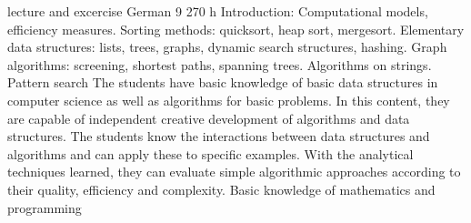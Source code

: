 {lecture and excercise}
{German}
{9}
{270 h}
{Introduction: Computational models, efficiency measures. Sorting methods: quicksort, heap sort, mergesort. Elementary data structures: lists, trees, graphs, dynamic search structures, hashing. Graph algorithms: screening, shortest paths, spanning trees. Algorithms on strings. Pattern search}
{The students have basic knowledge of basic data structures in computer science as well as algorithms for basic problems. In this content, they are capable of independent creative development of algorithms and data structures. The students know the interactions between data structures and algorithms and can apply these to specific examples. With the analytical techniques learned, they can evaluate simple algorithmic approaches according to their quality, efficiency and complexity.}
{Basic knowledge of mathematics and programming}
